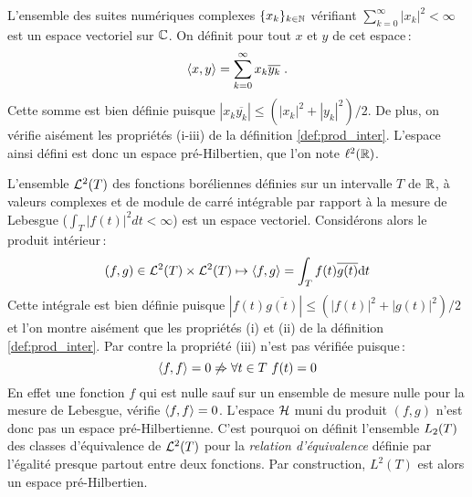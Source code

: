 \begin{example}
L'ensemble des suites num\'{e}riques complexes $\{ x_k \}_{k \in
\mathbb{N}}$ v\'{e}rifiant $\sum_{k = 0}^\infty |x_k|^2 < \infty$
est un espace vectoriel sur $\mathbb{C}$. On d\'{e}finit pour tout $x$ et $y$ de cet
espace\,:
\[
\left\langle x, y \right\rangle = \sum_{k=0}^\infty {x}_k\overline{y_k}
   \;.
\]
Cette somme est bien d\'{e}finie puisque $|{x}_k\overline{y_k}|\leq(|x_k|^2+|y_k|^2)/2$.
De plus, on v\'{e}rifie ais\'{e}ment les propri\'{e}t\'{e}s (i-iii) de la d\'{e}finition
\ref{def:prod_inter}. L'espace ainsi d\'{e}fini est donc un espace
pr\'{e}-Hilbertien, que l'on note $\ell^2(\mathbb{R})$.
\end{example}
\begin{example}
\label{exemple:L2}
  L'ensemble $\mathcal{L}^2(T)$ des fonctions bor\'{e}liennes d\'{e}finies sur un intervalle
  $T$ de $\mathbb{R}$, \`{a} valeurs complexes et de module de carr\'{e} int\'{e}grable par
  rapport \`{a} la mesure de Lebesgue ($\int_T |f(t)|^2 dt < \infty$) est un espace
  vectoriel.  Consid\'{e}rons alors le produit int\'{e}rieur\,:
\[
   (f,g) \in \mathcal{L}^2(T) \times \mathcal{L}^2(T)
    \mapsto \left\langle f, g \right\rangle=\int_T f(t) \overline{g(t)} \mathrm{d} t
\]
Cette int\'{e}grale est bien d\'{e}finie puisque
$|{f(t)} \overline{g(t)}|\leq(|f(t)|^2+|g(t)|^2)/2$
et l'on montre ais\'{e}ment que les propri\'{e}t\'{e}s
(i) et (ii) de la d\'{e}finition \ref{def:prod_inter}. Par contre la
propri\'{e}t\'{e} (iii) n'est pas v\'{e}rifi\'{e}e puisque\,:
\[
 \pscal{f}{f}=0 \not\Rightarrow \forall t\in T\ f(t)=0
\]
En effet une fonction $f$ qui est nulle sauf sur un ensemble de
mesure nulle pour la mesure de Lebesgue, v\'{e}rifie $\left\langle f, f \right\rangle=0$.
L'espace $\mathcal{H}$ muni du produit $(f,g)$ n'est donc pas un espace
pr\'{e}-Hilbertienne.
C'est pourquoi on d\'{e}finit l'ensemble $L_2(T)$ des classes d'\'{e}quivalence
de  $\mathcal{L}^2(T)$ pour la \emph{relation d'\'{e}quivalence} d\'{e}finie par
l'\'{e}galit\'{e} presque partout entre deux fonctions. Par construction,
 $L^2(T)$ est alors un espace pr\'{e}-Hilbertien.
\end{example}
